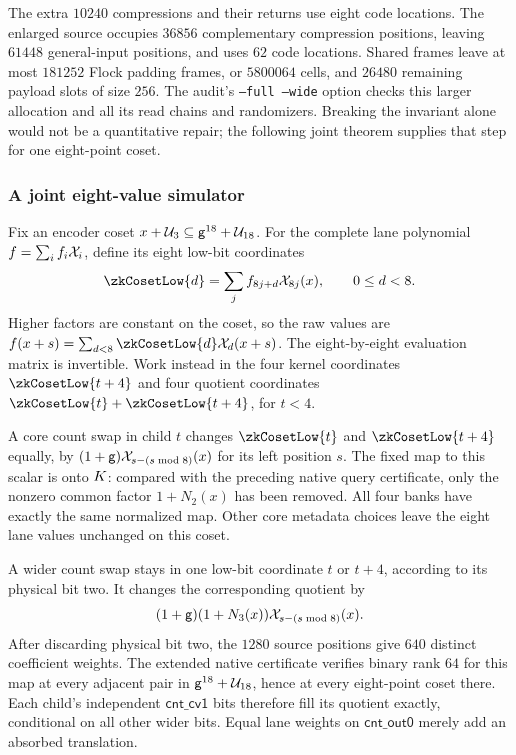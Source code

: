 The extra $10240$ compressions and their returns use eight code locations. The enlarged source occupies $36856$ complementary compression positions, leaving $61448$ general-input positions, and uses $62$ code locations. Shared frames leave at most $181252$ Flock padding frames, or $5800064$ cells, and $26480$ remaining payload slots of size $256$. The audit's \texttt{--full --wide} option checks this larger allocation and all its read chains and randomizers. Breaking the invariant alone would not be a quantitative repair; the following joint theorem supplies that step for one eight-point coset.

\subsubsection{A joint eight-value simulator}

Fix an encoder coset $x+\mathcal{U}_3\subseteq\mathsf{g}^{18}+\mathcal{U}_{18}$. For the complete lane polynomial $f=\sum_i f_i\mathcal{X}_i$, define its eight low-bit coordinates
\[
 \zkCosetLow{d}=\sum_j f_{8j+d}\novel_{8j}(x),\qquad 0\le d<8.
\]
Higher factors are constant on the coset, so the raw values are $f(x+s)=\sum_{d<8}\zkCosetLow{d}\novel_d(x+s)$. The eight-by-eight evaluation matrix is invertible. Work instead in the four kernel coordinates $\zkCosetLow{t+4}$ and four quotient coordinates $\zkCosetLow{t}+\zkCosetLow{t+4}$, for $t<4$.

A core count swap in child $t$ changes $\zkCosetLow{t}$ and $\zkCosetLow{t+4}$ equally, by $(1+\mathsf{g})\mathcal{X}_{s-(s\bmod8)}(x)$ for its left position $s$. The fixed map to this scalar is onto $K$: compared with the preceding native query certificate, only the nonzero common factor $1+N_2(x)$ has been removed. All four banks have exactly the same normalized map. Other core metadata choices leave the eight lane values unchanged on this coset.

A wider count swap stays in one low-bit coordinate $t$ or $t+4$, according to its physical bit two. It changes the corresponding quotient by
\[
 (1+\mathsf{g})(1+N_3(x))\mathcal{X}_{s-(s\bmod8)}(x).
\]
After discarding physical bit two, the $1280$ source positions give $640$ distinct coefficient weights. The extended native certificate verifies binary rank $64$ for this map at every adjacent pair in $\mathsf{g}^{18}+\mathcal{U}_{18}$, hence at every eight-point coset there. Each child's independent $\mathsf{cnt\_cv1}$ bits therefore fill its quotient exactly, conditional on all other wider bits. Equal lane weights on $\mathsf{cnt\_out0}$ merely add an absorbed translation.

